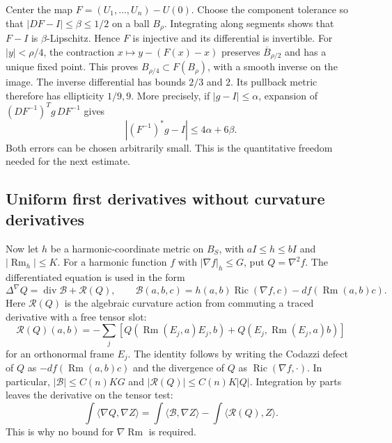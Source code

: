 Center the map $F=(U_1,\ldots,U_n)-U(0)$.  Choose the component
tolerance so that $|DF-I|\leq\beta\leq1/2$ on a ball $B_\rho$.
Integrating along segments shows that $F-I$ is
$\beta$-Lipschitz.  Hence $F$ is injective and its differential
is invertible.  For $|y|<\rho/4$, the contraction
$x\mapsto y-(F(x)-x)$ preserves $\overline B_{\rho/2}$ and
has a unique fixed point.  This proves
$B_{\rho/4}\subset F(B_\rho)$, with a smooth inverse on the
image.  The inverse differential has bounds $2/3$ and $2$.
Its pullback metric therefore has ellipticity $1/9,9$.
More precisely, if $|g-I|\leq\alpha$, expansion of
$(DF^{-1})^Tg\,DF^{-1}$ gives
\[
 |(F^{-1})^*g-I|\leq4\alpha+6\beta.
\]
Both errors can be chosen arbitrarily small.  This is the
quantitative freedom needed for the next estimate.

\subsection{Uniform first derivatives without curvature derivatives}

Now let $h$ be a harmonic-coordinate metric on $B_S$, with
$aI\leq h\leq bI$ and $|\operatorname{Rm}_h|\leq K$.
For a harmonic function $f$ with $|\nabla f|_h\leq G$, put
$Q=\nabla^2f$.  The differentiated equation is used in the form
\begin{equation}\label{eq:rf-hessian-divergence}
 \Delta^\nabla Q=\operatorname{div}\mathcal B+\mathcal R(Q),
 \qquad
 \mathcal B(a,b,c)=h(a,b)\operatorname{Ric}(\nabla f,c)
                         -df(\operatorname{Rm}(a,b)c).
\end{equation}
Here $\mathcal R(Q)$ is the algebraic curvature action from
commuting a traced derivative with a free tensor slot:
\[
 \mathcal R(Q)(a,b)=-\sum_j\left[
 Q(\operatorname{Rm}(E_j,a)E_j,b)
       +Q(E_j,\operatorname{Rm}(E_j,a)b)\right]
\]
for an orthonormal frame $E_j$.  The identity follows by writing
the Codazzi defect of $Q$ as $-df(\operatorname{Rm}(a,b)c)$
and the divergence of $Q$ as $\operatorname{Ric}(\nabla f,\cdot)$.
In particular,
$|\mathcal B|\leq C(n)KG$ and
$|\mathcal R(Q)|\leq C(n)K|Q|$.
Integration by parts leaves the derivative on the tensor test:
\[
 \int\langle\nabla Q,\nabla Z\rangle
 =\int\langle\mathcal B,\nabla Z\rangle
       -\int\langle\mathcal R(Q),Z\rangle.
\]
This is why no bound for $\nabla\operatorname{Rm}$ is required.

